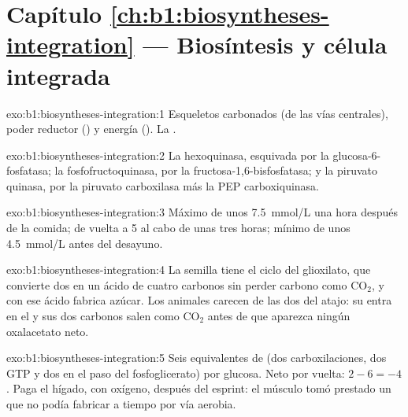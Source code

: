 \section*{Capítulo \ref{ch:b1:biosyntheses-integration} --- Biosíntesis y célula integrada}

\begin{solution}{exo:b1:biosyntheses-integration:1}
Esqueletos carbonados (de las vías centrales), poder reductor () y
energía (). La .
\end{solution}

\begin{solution}{exo:b1:biosyntheses-integration:2}
La hexoquinasa, esquivada por la glucosa-6-fosfatasa; la
fosfofructoquinasa, por la fructosa-1,6-bisfosfatasa; y la piruvato quinasa,
por la piruvato carboxilasa más la PEP carboxiquinasa.
\end{solution}

\begin{solution}{exo:b1:biosyntheses-integration:3}
Máximo de unos \qty{7.5}{mmol/L} una hora después de la comida; de vuelta a
\qty{5}{} al cabo de unas tres horas; mínimo de unos \qty{4.5}{mmol/L} antes
del desayuno.
\end{solution}

\begin{solution}{exo:b1:biosyntheses-integration:4}
La semilla tiene el ciclo del glioxilato, que convierte dos  en un
ácido de cuatro carbonos sin perder carbono como $\mathrm{CO_2}$, y con ese
ácido fabrica azúcar. Los animales carecen de las dos  del atajo: su
 entra en el  y sus dos carbonos salen como
$\mathrm{CO_2}$ antes de que aparezca ningún oxalacetato neto.
\end{solution}

\begin{solution}{exo:b1:biosyntheses-integration:5}
Seis equivalentes de  (dos carboxilaciones, dos GTP y dos  en el paso
del fosfoglicerato) por glucosa. Neto por vuelta: $2 - 6 = -4$ . Paga el
hígado, con oxígeno, después del esprint: el músculo tomó prestado un 
que no podía fabricar a tiempo por vía aerobia.
\end{solution}

